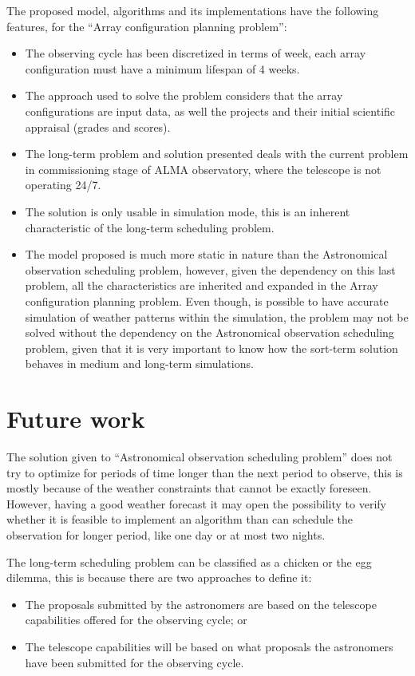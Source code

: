 The proposed model, algorithms and its implementations have the following features, for the ``Array configuration planning problem'':
\begin{itemize}
\item The observing cycle has been discretized in terms of week, each array configuration must have a minimum lifespan of 4 weeks.

\item The approach used to solve the problem considers that the array configurations are input data, as well the projects and their initial scientific appraisal (grades and scores).

\item The long-term problem and solution presented deals with the current problem in commissioning stage of ALMA observatory, where the telescope is not operating 24/7.

\item The solution is only usable in simulation mode, this is an inherent characteristic of the long-term scheduling problem.

\item The model proposed is much more static in nature than the Astronomical observation scheduling problem, however, given the dependency on this last problem, all the characteristics are inherited and expanded in the Array configuration planning problem. Even though, is possible to have accurate simulation of weather patterns within the simulation, the problem may not be solved without the dependency on the Astronomical observation scheduling problem, given that it is very important to know how the sort-term solution behaves in medium and long-term simulations.

\end{itemize}

\section{Future work}
The solution given to ``Astronomical observation scheduling problem'' does not try to optimize for periods of time longer than the next period to observe, this is mostly because of the weather constraints that cannot be exactly foreseen. However, having a good weather forecast it may open the possibility to verify whether it is feasible to implement an algorithm than can schedule the observation for longer period, like one day or at most two nights.

The long-term scheduling problem can be classified as a chicken or the egg dilemma, this is because there are two approaches to define it:
\begin{itemize}
\item The proposals submitted by the astronomers are based on the telescope capabilities offered for the observing cycle; or
\item The telescope capabilities will be based on what proposals the astronomers have been submitted for the observing cycle.
\end{itemize}

